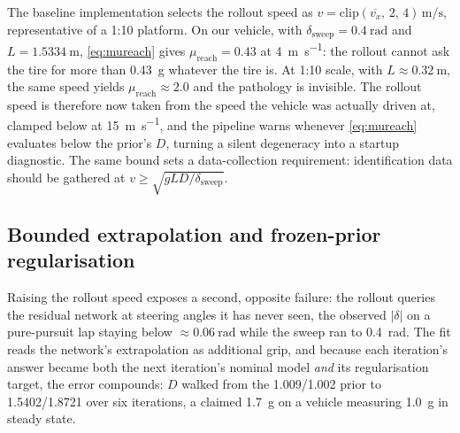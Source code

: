 The baseline implementation selects the rollout speed as
$v=\mathrm{clip}(\overline{v_{x}},\,2,\,4)\,\si{\meter\per\second}$,
representative of a 1:10 platform. On our vehicle, with
$\delta_{\mathrm{sweep}}=\SI{0.4}{\radian}$ and $L=\SI{1.5334}{\meter}$,
\eqref{eq:mureach} gives $\mu_{\mathrm{reach}}=0.43$ at
\SI{4}{\meter\per\second}: the rollout cannot ask the tire for more than
\SI{0.43}{\g} whatever the tire is. At 1:10 scale, with
$L\approx\SI{0.32}{\meter}$, the same speed yields
$\mu_{\mathrm{reach}}\approx2.0$ and the pathology is invisible. The rollout
speed is therefore now taken from the speed the vehicle was actually driven at,
clamped below at \SI{15}{\meter\per\second}, and the pipeline warns whenever
\eqref{eq:mureach} evaluates below the prior's $D$, turning a silent degeneracy
into a startup diagnostic. The same bound sets a data-collection requirement:
identification data should be gathered at
$v\ge\sqrt{gLD/\delta_{\mathrm{sweep}}}$.

\subsection{Bounded extrapolation and frozen-prior regularisation}
\label{subsec:iterative}

Raising the rollout speed exposes a second, opposite failure: the rollout
queries the residual network at steering angles it has never seen, the observed
$|\delta|$ on a pure-pursuit lap staying below $\approx\SI{0.06}{\radian}$ while
the sweep ran to \SI{0.4}{\radian}. The fit reads the network's extrapolation as
additional grip, and because each iteration's answer became both the next
iteration's nominal model \emph{and} its regularisation target, the error
compounds: $D$ walked from the \num{1.009}/\num{1.002} prior to
\num{1.5402}/\num{1.8721} over six iterations, a claimed \SI{1.7}{\g} on a
vehicle measuring \SI{1.0}{\g} in steady state.

